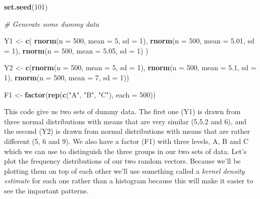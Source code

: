 \documentclass[
]{book}
\newenvironment{Shaded}{\begin{snugshade}}{\end{snugshade}}
\newcommand{\CommentTok}[1]{\textcolor[rgb]{0.56,0.35,0.01}{\textit{#1}}}
\newcommand{\DataTypeTok}[1]{\textcolor[rgb]{0.13,0.29,0.53}{#1}}
\newcommand{\DecValTok}[1]{\textcolor[rgb]{0.00,0.00,0.81}{#1}}
\newcommand{\FloatTok}[1]{\textcolor[rgb]{0.00,0.00,0.81}{#1}}
\newcommand{\KeywordTok}[1]{\textcolor[rgb]{0.13,0.29,0.53}{\textbf{#1}}}
\newcommand{\NormalTok}[1]{#1}
\newcommand{\StringTok}[1]{\textcolor[rgb]{0.31,0.60,0.02}{#1}}
\begin{document}
\begin{Shaded}
\begin{Highlighting}[]
\KeywordTok{set.seed}\NormalTok{(}\DecValTok{101}\NormalTok{)}

\CommentTok{# Generate some dummy data}

\NormalTok{Y1 <-}
\StringTok{  }\KeywordTok{c}\NormalTok{(}
    \KeywordTok{rnorm}\NormalTok{(}\DataTypeTok{n =} \DecValTok{500}\NormalTok{, }\DataTypeTok{mean =} \DecValTok{5}\NormalTok{, }\DataTypeTok{sd =} \DecValTok{1}\NormalTok{),}
    \KeywordTok{rnorm}\NormalTok{(}\DataTypeTok{n =} \DecValTok{500}\NormalTok{, }\DataTypeTok{mean =} \FloatTok{5.01}\NormalTok{, }\DataTypeTok{sd =} \DecValTok{1}\NormalTok{),}
    \KeywordTok{rnorm}\NormalTok{(}\DataTypeTok{n =} \DecValTok{500}\NormalTok{, }\DataTypeTok{mean =} \FloatTok{5.05}\NormalTok{, }\DataTypeTok{sd =} \DecValTok{1}\NormalTok{)}
\NormalTok{  )}

\NormalTok{Y2 <-}
\StringTok{  }\KeywordTok{c}\NormalTok{(}\KeywordTok{rnorm}\NormalTok{(}\DataTypeTok{n =} \DecValTok{500}\NormalTok{, }\DataTypeTok{mean =} \DecValTok{5}\NormalTok{, }\DataTypeTok{sd =} \DecValTok{1}\NormalTok{),}
    \KeywordTok{rnorm}\NormalTok{(}\DataTypeTok{n =} \DecValTok{500}\NormalTok{, }\DataTypeTok{mean =} \FloatTok{5.1}\NormalTok{, }\DataTypeTok{sd =} \DecValTok{1}\NormalTok{),}
    \KeywordTok{rnorm}\NormalTok{(}\DataTypeTok{n =} \DecValTok{500}\NormalTok{, }\DataTypeTok{mean =} \DecValTok{7}\NormalTok{, }\DataTypeTok{sd =} \DecValTok{1}\NormalTok{))}

\NormalTok{F1 <-}\StringTok{ }\KeywordTok{factor}\NormalTok{(}\KeywordTok{rep}\NormalTok{(}\KeywordTok{c}\NormalTok{(}\StringTok{"A"}\NormalTok{, }\StringTok{"B"}\NormalTok{, }\StringTok{"C"}\NormalTok{), }\DataTypeTok{each =} \DecValTok{500}\NormalTok{))}
\end{Highlighting}
\end{Shaded}

This code give us two sets of dummy data. The first one (Y1) is drawn from three normal distributions with means that are very similar (5,5.2 and 6), and the second (Y2) is drawn from normal distributions with means that are rather different (5, 6 and 9). We also have a factor (F1) with three levels, A, B and C which we can use to distinguish the three groups in our two sets of data. Let's plot the frequency distributions of our two random vectors. Because we'll be plotting them on top of each other we'll use something called a \emph{kernel density estimate} for each one rather than a histogram because this will make it easier to see the important patterns.
\end{document}
